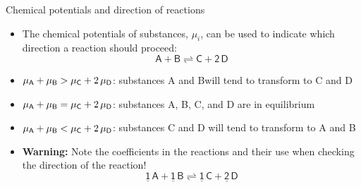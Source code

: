 %
\begin{frame}{Chemical potentials and direction of reactions}

\begin{itemize}[<+->]
\item The chemical potentials of substances, $\mu_{i}$, can be used to
indicate which direction a reaction should proceed: 
\[
\mathsf{A+B\rightleftharpoons C+2\,D}
\]
\item $\mu_{\sf A}+\mu_{\sf B}>\mu_{\sf C}+2\,\mu_{\sf D}$: substances A and Bwill
tend to transform to C and D
\item $\mu_{\sf A}+\mu_{\sf B}=\mu_{\sf C}+2\,\mu_{\sf D}$: substances A, B, C,
and D are in equilibrium 
\item $\mu_{\sf A}+\mu_{\sf B}<\mu_{\sf C}+2\,\mu_{\sf D}$: substances C and D will
tend to transform to A and B
\item \alert{\bf Warning:} Note the coefficients in the reactions and their use
when checking the direction of the reaction!
\[
\mathsf{\underline{1}\,A+\underline{1}\,B\rightleftharpoons\underline{1}\,C+\underline{2}\,D}
\]
\end{itemize}
\end{frame}
%
%

